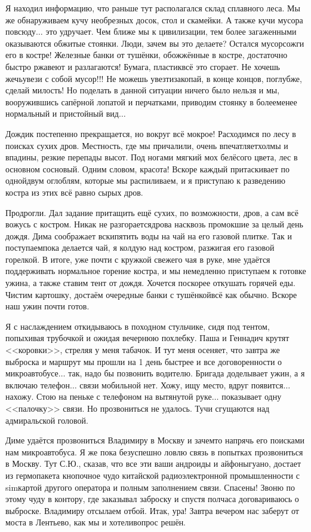 Я находил информацию, что раньше тут располагался склад сплавного леса. Мы же обнаруживаем кучу необрезных досок, стол и скамейки. А также кучи мусора повсюду$\ldots$ это удручает. Чем ближе мы к цивилизации, тем более загаженными оказываются обжитые стоянки. Люди, зачем вы это делаете? Остался мусор\mdash сожги его в костре! Железные банки от тушёнки, обожжённые в костре, достаточно быстро ржавеют и разлагаются! Бумага, пластик\mdash всё это сгорает. Не хочешь жечь\mdash увези с собой мусор!!! Не можешь увезти\mdash закопай, в конце концов, поглубже, сделай милость! Но поделать в данной ситуации ничего было нельзя и мы, вооружившись сапёрной лопатой и перчатками, приводим стоянку в более\sdash менее нормальный и пристойный вид$\ldots$ 

Дождик постепенно прекращается, но вокруг всё мокрое! Расходимся по лесу в поисках сухих дров. Местность, где мы причалили, очень впечатляет\mdash холмы и впадины, резкие перепады высот. Под ногами мягкий мох белёсого цвета, лес в основном сосновый. Одним словом, красота! Вскоре каждый притаскивает по одной\sdash двум оглоблям, которые мы распиливаем, и я приступаю к разведению костра из этих всё равно сырых дров. 

Продрогли. Дал задание притащить ещё сухих, по возможности, дров, а сам всё вожусь с костром. Никак не разгорается\mdash дрова насквозь промокшие за целый день дождя. Дима соображает вскипятить воды на чай на его газовой плитке. Так и поступаем\mdash пока делается чай, я колдую над костром, разжигая его газовой горелкой. В итоге, уже почти с кружкой свежего чая в руке, мне удаётся поддерживать нормальное горение костра, и мы немедленно приступаем к готовке ужина, а также ставим тент от дождя. Хочется поскорее откушать горячей еды. Чистим картошку, достаём очередные банки с тушёнкой\mdash всё как обычно. Вскоре наш ужин почти готов. 

Я с наслаждением откидываюсь в походном стульчике, сидя под тентом, попыхивая трубочкой и ожидая вечернюю похлебку. Паша и Геннадич крутят <<коровки>>, стреляя у меня табачок. И тут меня осеняет, что завтра же выброска и маршрут мы прошли на 1 день быстрее и все договоренности о микроавтобусе$\ldots$ так, надо бы позвонить водителю. Бригада доделывает ужин, а я включаю телефон$\ldots$ связи мобильной нет. Хожу, ищу место, вдруг появится$\ldots$ нахожу. Стою на пеньке с телефоном на вытянутой руке$\ldots$ показывает одну <<палочку>> связи. Но прозвониться не удалось. Тучи сгущаются над адмиральской головой. 

Диме удаётся прозвониться Владимиру в Москву и зачем\sdash то напрячь его поисками нам микроавтобуса. Я же пока безуспешно ловлю связь в попытках прозвониться в Москву. Тут С.Ю., сказав, что все эти ваши андроиды и айфоны\mdash гуано, достает из гермопакета кнопочное чудо китайской радиоэлектронной промышленности с sim\sdash картой другого оператора и полным заполнением связи. Спасены! Звоню по этому чуду в контору, где заказывал заброску и спустя полчаса договариваюсь о выброске. Владимиру отсылаем отбой. Итак, ура! Завтра вечером нас заберут от моста в Лентьево, как мы и хотели\mdash вопрос решён.

